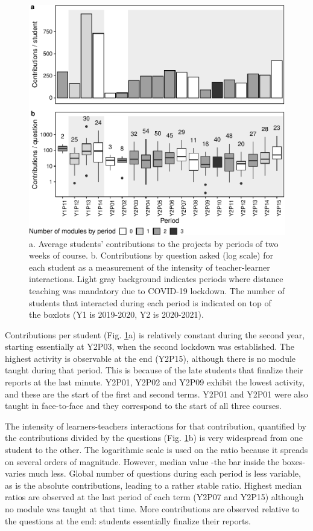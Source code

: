\documentclass{aims}
\theoremstyle{definition}
\begin{document}
\begin{figure}
\includegraphics[width=1\linewidth]{teaching_data_science_files/figure-latex/fig_support_by_time-1} \caption{\label{fig:fig_support_by_time} a. Average students' contributions to the projects by periods of two weeks of course. b. Contributions by question asked (log scale) for each student as a measurement of the intensity of teacher-learner interactions. Light gray background indicates periods where distance teaching was mandatory due to COVID-19 lockdown. The number of students that interacted during each period is indicated on top of the boxlots (Y1 is 2019-2020, Y2 is 2020-2021).}\label{fig:fig_support_by_time}
\end{figure}

Contributions per student (Fig. \ref {fig:fig_support_by_time}a) is
relatively constant during the second year, starting essentially at
Y2P03, when the second lockdown was established. The highest activity is
observable at the end (Y2P15), although there is no module taught during
that period. This is because of the late students that finalize their
reports at the last minute. Y2P01, Y2P02 and Y2P09 exhibit the lowest
activity, and these are the start of the first and second terms. Y2P01
and Y2P01 were also taught in face-to-face and they correspond to the
start of all three courses.

The intensity of learners-teachers interactions for that contribution,
quantified by the contributions divided by the questions (Fig.
\ref {fig:fig_support_by_time}b) is very widespread from one student to
the other. The logarithmic scale is used on the ratio because it spreads
on several orders of magnitude. However, median value -the bar inside
the boxes- varies much less. Global number of questions during each
period is less variable, as is the absolute contributions, leading to a
rather stable ratio. Highest median ratios are observed at the last
period of each term (Y2P07 and Y2P15) although no module was taught at
that time. More contributions are observed relative to the questions at
the end: students essentially finalize their reports.
\end{document}
